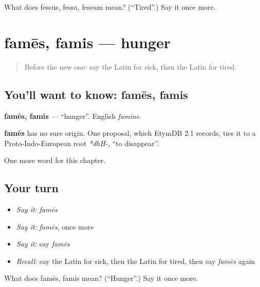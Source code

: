 \begin{tcolorbox}[breakable,colback=teal!4,colframe=teal!35!black,title={Before you move on}]
What does fessus, fessa, fessum mean? (\textquotedblleft{}Tired\textquotedblright{}.) Say it once more.
\end{tcolorbox}
\section[famēs, famis]{famēs, famis — hunger}

\label{lesson:LA-C68-fames}



\begin{quote}
Before the new one: say the Latin for sick, then the Latin for tired.
\end{quote}

\subsection*{You'll want to know: famēs, famis}
\textbf{famēs, famis} — \textquotedblleft{}hunger\textquotedblright{}. English \emph{famine}.

\begin{cousinweb}
\textbf{famēs} has no sure origin. One proposal, which EtymDB 2.1 records, ties it to a Proto-Indo-European root \emph{*dhH-}, \textquotedblleft{}to disappear\textquotedblright{}.
\end{cousinweb}

\begin{grammarlens}[title={What you've built}]
One more word for this chapter.
\end{grammarlens}

\subsection*{Your turn}
\begin{itemize}
\raggedright
  \item \emph{Say it:} \emph{famēs}
  \item \emph{Say it:} \emph{famēs}, once more
  \item \emph{Say it:} say \emph{famēs}
  \item \emph{Recall:} say the Latin for sick, then the Latin for tired, then say \emph{famēs} again
\end{itemize}

\begin{tcolorbox}[breakable,colback=teal!4,colframe=teal!35!black,title={Before you move on}]
What does famēs, famis mean? (\textquotedblleft{}Hunger\textquotedblright{}.) Say it once more.
\end{tcolorbox}
